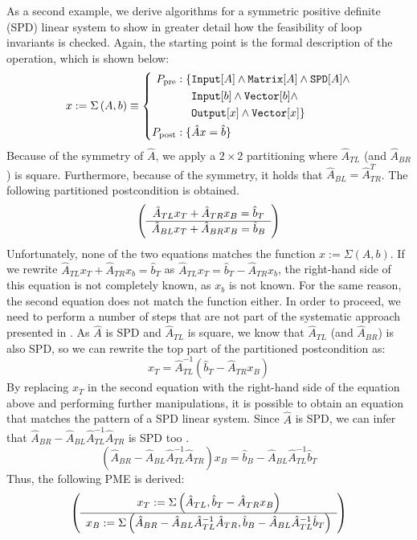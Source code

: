 As a second example, we derive algorithms for a symmetric positive definite (SPD) linear system to show in greater detail how the feasibility of loop invariants is checked. Again, the starting point is the formal description of the operation, which is shown below: 
%
$$x:= \Sigma \left( A, b\right) \equiv
\left\{
\begin{aligned}
P_\text{pre}: \{ &\text{\ttfamily Input}[A] \land \text{\ttfamily Matrix}[A] \land \text{\ttfamily SPD}[A] \land \\
		&\text{\ttfamily Input}[b] \land \text{\ttfamily Vector}[b] \land \\
		&\text{\ttfamily Output}[x] \land \text{\ttfamily Vector}[x] \} \\
P_\text{post}: \{ & \hat{A}x = \hat{b} \}
\end{aligned}
\right.$$
%
Because of the symmetry of $\hat{A}$, we apply a $2 \times 2$ partitioning where $\hat{A}_{TL}$ (and $\hat{A}_{BR}$) is square. Furthermore, because of the symmetry, it holds that $\hat{A}_{BL} = \hat{A}_{TR}^T$. The following partitioned postcondition is obtained.
%
$$\myFlaTwoByOne{\hat{A}_{TL} x_T + \hat{A}_{TR} x_B  = \hat{b}_T}{\hat{A}_{BL} x_T + \hat{A}_{BR} x_B = \hat{b}_B}$$
%
Unfortunately, none of the two equations matches the function $x:= \Sigma \left( A, b\right)$. If we rewrite $\hat{A}_{TL} x_T + \hat{A}_{TR} x_b  = \hat{b}_T$ as $\hat{A}_{TL} x_T = \hat{b}_T - \hat{A}_{TR} x_b $, the right-hand side of this equation is not completely known, as $x_b$ is not known. For the same reason, the second equation does not match the function either. In order to proceed, we need to perform a number of steps that are not part of the systematic approach presented in \cite{Fabregat-Traver:thesis}. As $\hat{A}$ is SPD and $\hat{A}_{TL}$ is square, we know that $\hat{A}_{TL}$ (and $\hat{A}_{BR}$) is also SPD, so we can rewrite the top part of the partitioned postcondition as:
%
$$x_T = \hat{A}_{TL}^{-1} \left( \hat{b}_T - \hat{A}_{TR} x_B \right)$$
%
By replacing $x_T$ in the second equation with the right-hand side of the equation above and performing further manipulations, it is possible to obtain an equation that matches the pattern of a SPD linear system. Since $\hat{A}$ is SPD, we can infer that $\hat{A}_{BR} - \hat{A}_{BL} \hat{A}_{TL}^{-1} \hat{A}_{TR}$ is SPD too \cite{stew:98a}.
%
$$\left( \hat{A}_{BR} - \hat{A}_{BL} \hat{A}_{TL}^{-1} \hat{A}_{TR} \right) x_B = \hat{b}_B - \hat{A}_{BL} \hat{A}_{TL}^{-1} \hat{b}_T$$
%
Thus, the following PME is derived:
%
$$\myFlaTwoByOne{x_T := \Sigma \left(\hat{A}_{TL}, \hat{b}_T - \hat{A}_{TR} x_B \right)}{x_B := \Sigma \left( \hat{A}_{BR} - \hat{A}_{BL} \hat{A}_{TL}^{-1} \hat{A}_{TR} , \hat{b}_B - \hat{A}_{BL} \hat{A}_{TL}^{-1} \hat{b}_T \right)}$$
